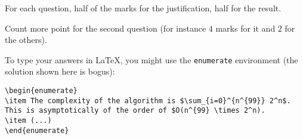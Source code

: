 \begin{markingScheme}
  For each question, half of the marks for the justification, half for
  the result.

  Count more point for the second question (for instance $4$ marks for
  it and $2$ for the others).
\end{markingScheme}


\begin{codeExample}
  To type your answers in \LaTeX, you might use the \verb+enumerate+
  environment (the solution shown here is bogus):
\begin{verbatim}
\begin{enumerate}
\item The complexity of the algorithm is $\sum_{i=0}^{n^{99}} 2^n$.
This is asymptotically of the order of $O(n^{99} \times 2^n).
\item (...)
\end{enumerate}
\end{verbatim}
\end{codeExample}
